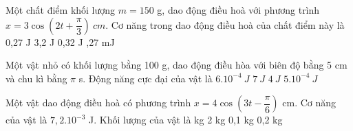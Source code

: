 \setcounter{ex}{0}
\setcounter{paragraph}{0}
\PhanI
\begin{ex} %
Một chất điểm khối lượng $ m = 150$ g, dao động điều hoà với phương trình $x = 3\cos(2t + \dfrac{\pi}{3})\ cm$. Cơ năng trong dao động điều hoà của chất điểm này là
\choice
{0,27 J}
{3,2 J}
{0,32 J}
{,27 mJ}
\end{ex} 

\begin{ex} %
Một vật nhỏ có khối lượng bằng 100 g, dao động điều hòa với biên độ bằng 5 cm và chu kì bằng $\pi$ s. Động năng cực đại của vật là
\choice
{$6.10^{-4}\ J$}
{$7\ J$}
{$4\ J$}
{\True $5.10^{-4}\ J$}
\end{ex} 

\begin{ex} %
Một vật dao động điều hoà có phương trình $x = 4\cos(3t-\dfrac{\pi}{6})$ cm. Cơ năng của vật là $7,2.10^{-3}$ J. Khối lượng của vật là
\choice
{ kg}
{2 kg}
{0,1 kg}
{0,2 kg}
\end{ex} 

